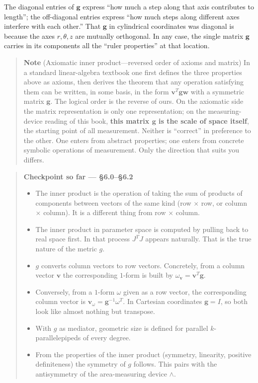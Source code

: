 \documentclass[a4paper,12pt,openany]{book}
\begin{document}
The diagonal entries of \(\mathbf{g}\) express ``how much a step along
that axis contributes to length''; the off-diagonal entries express
``how much steps along different axes interfere with each other.'' That
\(\mathbf{g}\) in cylindrical coordinates was diagonal is because the
axes \(r,\theta,z\) are mutually orthogonal. In any case, the single
matrix \(\mathbf{g}\) carries in its components all the ``ruler
properties'' at that location.

\begin{quote}
\textbf{Note} (Axiomatic inner product—reversed order of axioms and
matrix) In a standard linear-algebra textbook one first defines the
three properties above as axioms, then derives the theorem that any
operation satisfying them can be written, in some basis, in the form
\(\mathbf{v}^T \mathbf{g} \mathbf{w}\) with a symmetric matrix
\(\mathbf{g}\). The logical order is the reverse of ours. On the
axiomatic side the matrix representation is only one representation; on
the measuring-device reading of this book,
\textbf{this matrix $\mathbf{g}$ is the scale of space itself}, the
starting point of all measurement. Neither is ``correct'' in preference
to the other. One enters from abstract properties; one enters from
concrete symbolic operations of measurement. Only the direction that
suits you differs.
\end{quote}

\begin{quote}
\textbf{Checkpoint so far — §6.0–§6.2}

\begin{itemize}
\item
  The inner product is the operation of taking the sum of products of
  components between vectors of the same kind (row × row, or column ×
  column). It is a different thing from row × column.
\item
  The inner product in parameter space is computed by pulling back to
  real space first. In that process \(J^T J\) appears naturally. That is
  the true nature of the metric \(g\).
\item
  \(g\) converts column vectors to row vectors. Concretely, from a
  column vector \(\mathbf{v}\) the corresponding \(1\)-form is built by
  \(\omega_{\mathbf{v}} = \mathbf{v}^T\mathbf{g}\).
\item
  Conversely, from a \(1\)-form \(\omega\) given as a row vector, the
  corresponding column vector is
  \(\mathbf{v}_\omega = \mathbf{g}^{-1}\omega^T\). In Cartesian
  coordinates \(\mathbf{g}=I\), so both look like almost nothing but
  transpose.
\item
  With \(g\) as mediator, geometric size is defined for parallel
  \(k\)-parallelepipeds of every degree.
\item
  From the properties of the inner product (symmetry, linearity,
  positive definiteness) the symmetry of \(g\) follows. This pairs with
  the antisymmetry of the area-measuring device \(\wedge\).
\end{itemize}
\end{quote}
\end{document}
